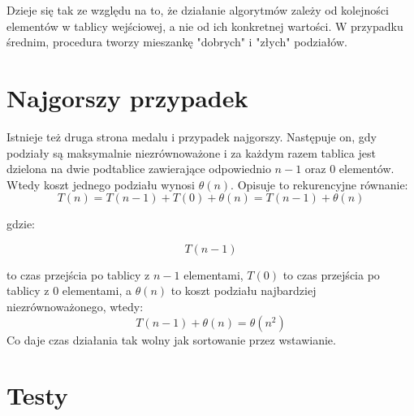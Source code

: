 \documentclass[a4paper,11pt]{report}
\begin{document}
Dzieje się tak ze względu na to, że działanie algorytmów zależy od kolejności elementów w tablicy wejściowej, a nie od ich konkretnej wartości. W przypadku średnim, procedura tworzy mieszankę "dobrych" i "złych" podziałów.

\section{Najgorszy przypadek}
Istnieje też druga strona medalu i przypadek najgorszy. Następuje on, gdy podziały są maksymalnie niezrównoważone i za każdym razem tablica jest dzielona na dwie podtablice zawierające odpowiednio $n-1$ oraz 0 elementów. Wtedy koszt jednego podziału wynosi $\theta (n)$. Opisuje to rekurencyjne równanie:
\begin{equation*}
T(n) = T(n-1) + T(0) + \theta(n) = T(n-1) + \theta(n)
\end{equation*}

gdzie:

\begin{equation*}
T(n-1)
\end{equation*}

to czas przejścia po tablicy z $n-1$ elementami, $T(0)$ to czas przejścia po tablicy z 0 elementami, a $\theta(n)$ to koszt podziału najbardziej niezrównoważonego, wtedy:
\begin{equation*}
T(n-1) + \theta(n) = \theta(n^2)
\end{equation*}
Co daje czas działania tak wolny jak sortowanie przez wstawianie.

\section{Testy}
\end{document}
